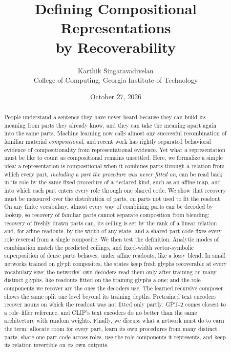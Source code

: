 \documentclass[10pt]{article}
\title{Defining Compositional Representations\\ by Recoverability}
\author{Karthik Singaravadivelan\\ College of Computing, Georgia Institute of Technology}
\date{October 27, 2026}
\theoremstyle{plain}
\theoremstyle{remark}
\begin{document}
\maketitle

\begin{abstract}
People understand a sentence they have never heard because they can build its meaning from parts they already know, and they can take the meaning apart again into the same parts. Machine learning now calls almost any successful recombination of familiar material \emph{compositional}, and recent work has rightly separated behavioral evidence of compositionality from representational evidence. Yet what a representation must be like to count as compositional remains unsettled. Here, we formalize a simple idea: a representation is compositional when it combines parts through a relation from which every part, \emph{including a part the procedure was never fitted on}, can be read back in its role by the same fixed procedure of a declared kind, such as an affine map, and into which each part enters every role through one shared code. We show that recovery must be measured over the distribution of parts, on parts not used to fit the readout. On any finite vocabulary, almost every way of combining parts can be decoded by lookup, so recovery of familiar parts cannot separate composition from blending; recovery of freshly drawn parts can, its ceiling is set by the rank of a linear relation and, for affine readouts, by the width of any state, and a shared part code fixes every role reversal from a single composite. We then test the definition. Analytic modes of combination match the predicted ceilings, and fixed-width vector-symbolic superposition of dense parts behaves, under affine readouts, like a lossy blend. In small networks trained on glyph composites, the states keep fresh glyphs recoverable at every vocabulary size; the networks' own decoders read them only after training on many distinct glyphs, like readouts fitted on the training glyphs alone; and the role components we recover are the ones the decoders use. The learned recursive composer shows the same split one level beyond its training depths. Pretrained text encoders recover nouns on which the readout was not fitted only partly; GPT-2 comes closest to a role--filler reference, and CLIP's text encoders do no better than the same architecture with random weights. Finally, we discuss what a network must do to earn the term: allocate room for every part, learn its own procedures from many distinct parts, share one part code across roles, use the role components it represents, and keep its relation invertible on its own outputs.
\end{abstract}
\end{document}
